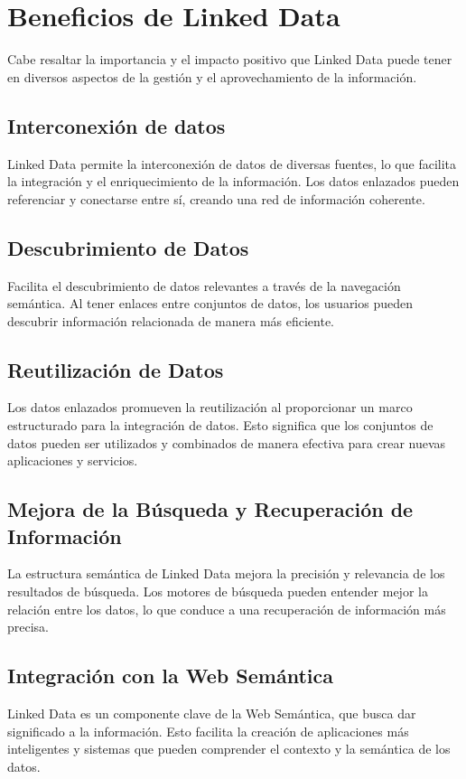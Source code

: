 \documentclass[11pt]{report}
\begin{document}
\chapter{Beneficios de Linked Data}
Cabe resaltar la importancia y el impacto positivo que Linked Data puede tener en diversos aspectos de la gestión y el aprovechamiento de la información.
\section{Interconexión de datos}

		Linked Data permite la interconexión de datos de diversas fuentes, lo que facilita la integración y el enriquecimiento de la información. Los datos enlazados pueden referenciar y conectarse entre sí, creando una red de información coherente.
\section{Descubrimiento de Datos}

		Facilita el descubrimiento de datos relevantes a través de la navegación semántica. Al tener enlaces entre conjuntos de datos, los usuarios pueden descubrir información relacionada de manera más eficiente.
\section{Reutilización de Datos}

		Los datos enlazados promueven la reutilización al proporcionar un marco estructurado para la integración de datos. Esto significa que los conjuntos de datos pueden ser utilizados y combinados de manera efectiva para crear nuevas aplicaciones y servicios.
\section{Mejora de la Búsqueda y Recuperación de Información}

		La estructura semántica de Linked Data mejora la precisión y relevancia de los resultados de búsqueda. Los motores de búsqueda pueden entender mejor la relación entre los datos, lo que conduce a una recuperación de información más precisa.
\section{Integración con la Web Semántica}

		Linked Data es un componente clave de la Web Semántica, que busca dar significado a la información. Esto facilita la creación de aplicaciones más inteligentes y sistemas que pueden comprender el contexto y la semántica de los datos.
\end{document}
